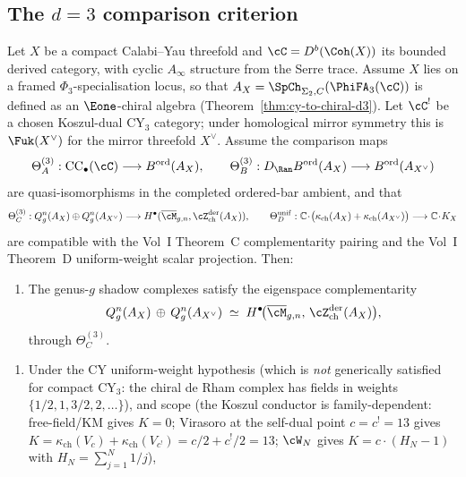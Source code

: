 \subsection{The \texorpdfstring{$d = 3$}{d = 3} comparison criterion}

\begin{theorem}[CY complementarity at \texorpdfstring{$d = 3$}{d = 3} through the comparison criterion]
\label{conj:cy-complementarity-d3}
Let $X$ be a compact Calabi--Yau threefold and $\cC = D^b(\Coh(X))$ its bounded derived category, with cyclic $A_\infty$ structure from the Serre trace. Assume $X$ lies on a framed $\Phi_3$-specialisation locus, so that
$A_X = \SpCh_{\Sigma_2,C}(\PhiFA_3(\cC))$ is defined as an $\Eone$-chiral algebra (Theorem~\ref{thm:cy-to-chiral-d3}). Let $\cC^!$ be a chosen Koszul-dual CY$_3$ category; under homological mirror symmetry this is $\Fuk(X^\vee)$ for the mirror threefold $X^\vee$. Assume the comparison maps
\[
\Theta_A^{(3)}:\mathrm{CC}_\bullet(\cC)\longrightarrow B^{\mathrm{ord}}(A_X),
\qquad
\Theta_B^{(3)}:D_{\Ran}B^{\mathrm{ord}}(A_X)\longrightarrow
B^{\mathrm{ord}}(A_{X^\vee})
\]
are quasi-isomorphisms in the completed ordered-bar ambient, and that
\[
\Theta_C^{(3)}:
Q_g^n(A_X)\oplus Q_g^n(A_{X^\vee})\longrightarrow
H^\bullet(\overline{\cM}_{g,n},\cZ^{\mathrm{der}}_{\mathrm{ch}}(A_X)),
\qquad
\Theta_D^{\mathrm{unif}}:
\mathbb C\!\cdot\!\bigl(\kappa_{\mathrm{ch}}(A_X)+
\kappa_{\mathrm{ch}}(A_{X^\vee})\bigr)\longrightarrow
\mathbb C\!\cdot\!K_X
\]
are compatible with the Vol~I Theorem~C complementarity pairing and the
Vol~I Theorem~D uniform-weight scalar projection. Then:
\begin{enumerate}[label=\textup{(C1$^{\mathrm{CY}_3}$)}]
 \item The genus-$g$ shadow complexes satisfy the eigenspace complementarity
 \[
 Q_g^n(A_X) \,\oplus\, Q_g^n(A_{X^\vee}) \;\simeq\; H^\bullet\!\bigl(\overline{\cM}_{g,n},\, \cZ^{\mathrm{der}}_{\mathrm{ch}}(A_X)\bigr),
 \]
 through $\Theta_C^{(3)}$.
\end{enumerate}
\begin{enumerate}[label=\textup{(C$_{\mathrm{scal}}^{\mathrm{CY}_3}$)}]
 \item Under the CY uniform-weight hypothesis (which is \emph{not} generically satisfied for compact CY$_3$: the chiral de Rham complex has fields in weights $\{1/2, 1, 3/2, 2, \ldots\}$), and scope (the Koszul conductor is family-dependent: free-field/KM gives $K = 0$; Virasoro at the self-dual point $c = c^! = 13$ gives $K = \kappa_{\mathrm{ch}}(V_c) + \kappa_{\mathrm{ch}}(V_{c^!}) = c/2 + c^!/2 = 13$; $\cW_N$ gives $K = c \cdot (H_N - 1)$ with $H_N = \sum_{j=1}^{N} 1/j$),

\end{enumerate}
\end{theorem}
